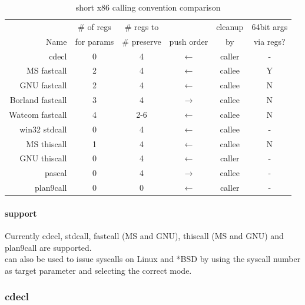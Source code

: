 \begin{table}[h]
\begin{tabular*}{0.95\textwidth}{rccccc}
                 & \# of regs & \# regs to  &               & cleanup & 64bit args \\
Name             & for params & \# preserve & push order    & by      & via regs?  \\
\hline                           
cdecl            & 0          & 4           & $\leftarrow$  & caller  & -          \\
MS fastcall      & 2          & 4           & $\leftarrow$  & callee  & Y          \\
GNU fastcall     & 2          & 4           & $\leftarrow$  & callee  & N          \\
Borland fastcall & 3          & 4           & $\rightarrow$ & callee  & N          \\
Watcom fastcall  & 4          & 2-6         & $\leftarrow$  & callee  & N          \\
win32 stdcall    & 0          & 4           & $\leftarrow$  & callee  & -          \\
MS thiscall      & 1          & 4           & $\leftarrow$  & callee  & N          \\
GNU thiscall     & 0          & 4           & $\leftarrow$  & caller  & -          \\
pascal           & 0          & 4           & $\rightarrow$ & callee  & -          \\
plan9call        & 0          & 0           & $\leftarrow$  & caller  & -          \\
\end{tabular*}
\caption{short x86 calling convention comparison}
\end{table}


\paragraph{ support}

Currently cdecl, stdcall, fastcall (MS and GNU), thiscall (MS and GNU) and
plan9call are supported.\\
 can also be used to issue syscalls on Linux and *BSD by using
the syscall number as target parameter and selecting the correct mode.



\pagebreak

\subsubsection{cdecl}

